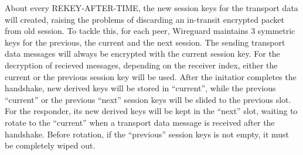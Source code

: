     About every \uppercase{REKEY-After-time}, the new session keys for the transport data will created,
    raising the problems of discarding an in-transit encrypted packet from old session. To tackle this,
    for each peer, Wireguard maintains 3 symmetric keys for the previous, the current and the next session.
    The sending transport data messages will always be encrypted with the current session key. For
    the decryption of recieved messages, depending on the receiver index, either the current 
    or the previous session key will be used. After the initatior completes the handshake, new
    derived keys will be stored in ``current'', while the previous ``current'' or the previous ``next''
    session keys will be slided to the previous slot. For the responder, its new derived keys will
    be kept in the ``next'' slot, waiting to rotate to the ``current'' when a transport data message
    is received after the handshake. Before rotation, if the ``previous'' session keys is not empty,
    it must be completely wiped out.



